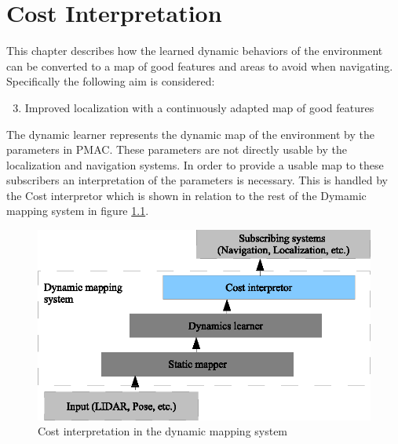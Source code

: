 \chapter{Cost Interpretation}
\label{chapter:cost_interpretation}
This chapter describes how the learned dynamic behaviors of the environment can be converted to a map of good features and areas to avoid when navigating. Specifically the following aim is considered:

\begin{enumerate}
    \setcounter{enumi}{2}
    \item Improved localization with a continuously adapted map of good features
\end{enumerate}

The dynamic learner represents the dynamic map of the environment by the parameters in PMAC. These parameters are not directly usable by the localization and navigation systems. In order to provide a usable map to these subscribers an interpretation of the parameters is necessary. This is handled by the Cost interpretor which is shown in relation to the rest of the Dymamic mapping system in figure \ref{fig:cost_overview}.

\begin{figure}[htbp]
	\centering
	\includegraphics[scale=1]{chapters/cost_interpretation/figures/cost_overview.eps}
	\caption{Cost interpretation in the dynamic mapping system}
	\label{fig:cost_overview}
\end{figure}








